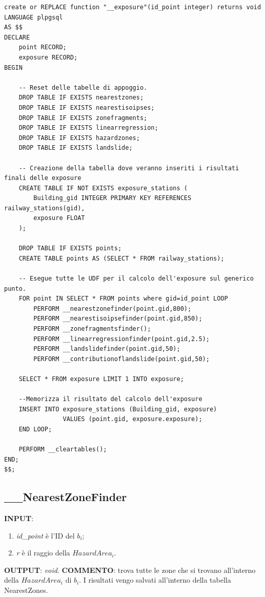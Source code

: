 \small
\begin{lstlisting}[style = mystyle]
create or REPLACE function "__exposure"(id_point integer) returns void
LANGUAGE plpgsql
AS $$
DECLARE
	point RECORD;
	exposure RECORD;
BEGIN
	
	-- Reset delle tabelle di appoggio.
	DROP TABLE IF EXISTS nearestzones;
	DROP TABLE IF EXISTS nearestisoipses;
	DROP TABLE IF EXISTS zonefragments;
	DROP TABLE IF EXISTS linearregression;
	DROP TABLE IF EXISTS hazardzones;
	DROP TABLE IF EXISTS landslide;
	
	-- Creazione della tabella dove veranno inseriti i risultati finali delle exposure
	CREATE TABLE IF NOT EXISTS exposure_stations (
		Building_gid INTEGER PRIMARY KEY REFERENCES railway_stations(gid),
		exposure FLOAT
	);

	DROP TABLE IF EXISTS points;
	CREATE TABLE points AS (SELECT * FROM railway_stations);

	-- Esegue tutte le UDF per il calcolo dell'exposure sul generico punto.
	FOR point IN SELECT * FROM points where gid=id_point LOOP
		PERFORM __nearestzonefinder(point.gid,800);
		PERFORM __nearestisoipsefinder(point.gid,850);
		PERFORM __zonefragmentsfinder();
		PERFORM __linearregressionfinder(point.gid,2.5);
		PERFORM __landslidefinder(point.gid,50);
		PERFORM __contributionoflandslide(point.gid,50);

	SELECT * FROM exposure LIMIT 1 INTO exposure;
	
	--Memorizza il risultato del calcolo dell'exposure
	INSERT INTO exposure_stations (Building_gid, exposure) 
				VALUES (point.gid, exposure.exposure);
	END LOOP;

	PERFORM __cleartables();
END;
$$;
\end{lstlisting}

\newpage
\subsection{\_\_NearestZoneFinder}
\textbf{INPUT}: 
\begin{enumerate}
	\item \textit{id\_point} è l'ID del $b_i$;
	\item \textit{r} è il raggio della $HazardArea_i$.
\end{enumerate}
\textbf{OUTPUT}: \textit{void}. \newline
\textbf{COMMENTO}: trova tutte le zone che si trovano all'interno della $HazardArea_i$ di $b_i$. I risultati vengo salvati all'interno della tabella NearestZones.

